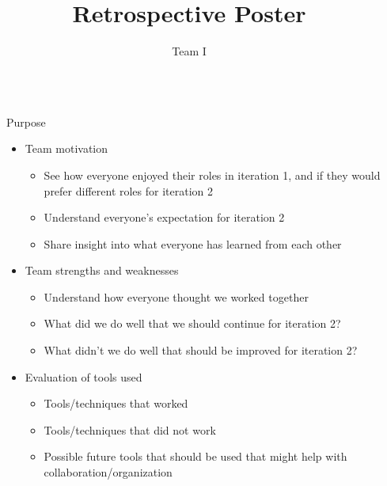 \documentclass[final,hyperref={pdfpagelabels=false}]{beamer}
\title{\huge Retrospective Poster} %
\author{Team I} %
\institute{COMP 354: Introduction to Software Engineering} %
\begin{document}

\begin{frame}[t] %

\begin{columns}[t] %

\begin{column}{.02\textwidth}\end{column} %

\begin{column}{.465\textwidth} %


\begin{block}{Purpose}

\begin{itemize}
   \item Team motivation 
   \begin{itemize}
     \item See how everyone enjoyed their roles in iteration 1, and if they would prefer different roles for iteration 2
     \item Understand everyone's expectation for iteration 2
     \item Share insight into what everyone has learned from each other
   \end{itemize}
   
   \item Team strengths and weaknesses
   \begin{itemize}
     \item Understand how everyone thought we worked together
     \item What did we do well that we should continue for iteration 2?
     \item What didn't we do well that should be improved for iteration 2?
   \end{itemize}

   \item Evaluation of tools used
   \begin{itemize}
     \item Tools/techniques that worked 
     \item Tools/techniques that did not work
     \item Possible future tools that should be used that might help with collaboration/organization
   \end{itemize}
\end{itemize}
\end{block}


\end{column}
\end{columns}
\end{frame}
\end{document}
